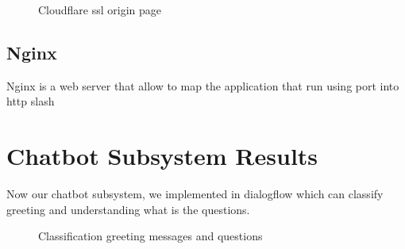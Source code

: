 \documentclass[12pt,oneside,openright,a4paper]{cpe-english-project}
\begin{document}
		\begin{figure}[!h]\centering
			\caption{Cloudflare ssl origin page}\label{fig:Cloudflare ssl origin page}
		\end{figure}
	\subsection{Nginx}
		Nginx is a web server that allow to map the application that run using port into http slash
\section{Chatbot Subsystem Results}
	Now our chatbot subsystem, we implemented in dialogflow which can classify greeting and understanding what is the questions.
	\begin{figure}[!h]\centering
		\caption{Classification greeting messages and questions}\label{fig:Classification greeting messages and questions success}
	\end{figure}
\pagebreak
\end{document}
